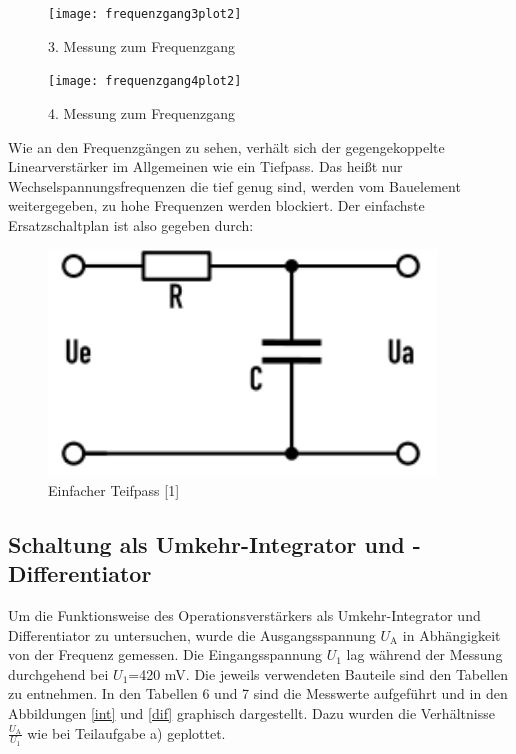 \documentclass{scrartcl}
\begin{document}
\newpage

\begin{figure}[!h]
\centering
\texttt{[image: frequenzgang3plot2]}
\caption{3. Messung zum Frequenzgang}
\label{integrator}
\end{figure}

\begin{figure}[!h]
\centering
\texttt{[image: frequenzgang4plot2]}
\caption{4. Messung zum Frequenzgang}
\label{integrator}
\end{figure}

\newpage


Wie an den Frequenzgängen zu sehen, verhält sich der gegengekoppelte Linearverstärker im Allgemeinen wie ein Tiefpass.
Das heißt nur Wechselspannungsfrequenzen die tief genug sind, werden vom Bauelement weitergegeben, zu hohe Frequenzen werden blockiert.
Der einfachste Ersatzschaltplan ist also gegeben durch:
\begin{figure}[H]
  \centering
  \includegraphics[height=6cm]{tiefpass.png}
  \caption{Einfacher Teifpass [1]}
  \label{abb1}
\end{figure}


 \subsection{Schaltung als Umkehr-Integrator und -Differentiator}
Um die Funktionsweise des Operationsverstärkers als Umkehr-Integrator und Differentiator zu untersuchen, wurde die Ausgangsspannung $U_\text{A}$ in Abhängigkeit von der Frequenz gemessen. Die Eingangsspannung $U_1$ lag während der Messung durchgehend bei $U_1$=420 mV.
Die jeweils verwendeten Bauteile sind den Tabellen zu entnehmen.
In den Tabellen 6 und 7 sind die Messwerte aufgeführt und in den Abbildungen \ref{int} und \ref{dif} graphisch dargestellt. Dazu wurden die Verhältnisse $\frac{U_\text{A}}{U_1}$ wie bei Teilaufgabe a) geplottet.
\end{document}
